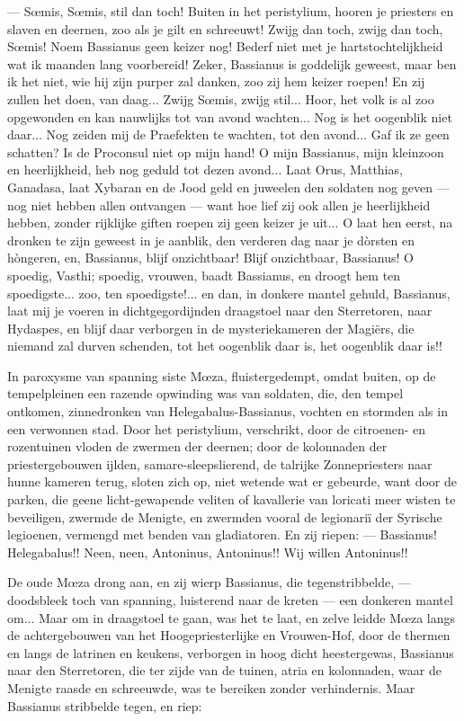 \documentclass[a4paper, 12pt, oneside, dutch]{article}
\begin{document}
--- Sœmis, Sœmis, stil dan toch! Buiten in het peristylium, hooren je priesters en slaven en deernen, zoo als je gilt en schreeuwt! Zwijg dan toch, zwijg dan toch, Sœmis! Noem Bassianus geen keizer nog! Bederf niet met je hartstochtelijkheid wat ik maanden lang voorbereid! Zeker, Bassianus is goddelijk geweest, maar ben ik het niet, wie hij zijn purper zal danken, zoo zij hem keizer roepen! En zij zullen het doen, van daag... Zwijg Sœmis, zwijg stil... Hoor, het volk is al zoo opgewonden en kan nauwlijks tot van avond wachten... Nog is het oogenblik niet daar... Nog zeiden mij de Praefekten te wachten, tot den avond... Gaf ik ze geen schatten? Is de Proconsul niet op mijn hand! O mijn Bassianus, mijn kleinzoon en heerlijkheid, heb nog geduld tot dezen avond... Laat Orus, Matthias, Ganadasa, laat Xybaran en de Jood geld en juweelen den soldaten nog geven --- nog niet hebben allen ontvangen --- want hoe lief zij ook allen je heerlijkheid hebben, zonder rijklijke giften roepen zij geen keizer je uit... O laat hen eerst, na dronken te zijn geweest in je aanblik, den verderen dag naar je dòrsten en hòngeren, en, Bassianus, blijf onzichtbaar! Blijf onzichtbaar, Bassianus! O spoedig, Vasthi; spoedig, vrouwen, baadt Bassianus, en droogt hem ten spoedigste... zoo, ten spoedigste!... en dan, in donkere mantel gehuld, Bassianus, laat mij je voeren in dichtgegordijnden draagstoel naar den Sterretoren, naar Hydaspes, en blijf daar verborgen in de mysteriekameren der Magiërs, die niemand zal durven schenden, tot het oogenblik daar is, het oogenblik daar is!!

In paroxysme van spanning siste Mœza, fluistergedempt, omdat buiten, op de tempelpleinen een razende opwinding was van soldaten, die, den tempel ontkomen, zinnedronken van Helegabalus-Bassianus, vochten en stormden als in een verwonnen stad. Door het peristylium, verschrikt, door de citroenen- en rozentuinen vloden de zwermen der deernen; door de kolonnaden der priestergebouwen ijlden, samare-sleepslierend, de talrijke Zonnepriesters naar hunne kameren terug, sloten zich op, niet wetende wat er gebeurde, want door de parken, die geene licht-gewapende veliten of kavallerie van loricati meer wisten te beveiligen, zwermde de Menigte, en zwermden vooral de legionariï der Syrische legioenen, vermengd met benden van gladiatoren. En zij riepen: --- Bassianus! Helegabalus!! Neen, neen, Antoninus, Antoninus!! Wij willen Antoninus!!

De oude Mœza drong aan, en zij wierp Bassianus, die tegenstribbelde, --- doodsbleek toch van spanning, luisterend naar de kreten --- een donkeren mantel om... Maar om in draagstoel te gaan, was het te laat, en zelve leidde Mœza langs de achtergebouwen van het Hoogepriesterlijke en Vrouwen-Hof, door de thermen en langs de latrinen en keukens, verborgen in hoog dicht heestergewas, Bassianus naar den Sterretoren, die ter zijde van de tuinen, atria en kolonnaden, waar de Menigte raasde en schreeuwde, was te bereiken zonder verhindernis. Maar Bassianus stribbelde tegen, en riep:
\end{document}
